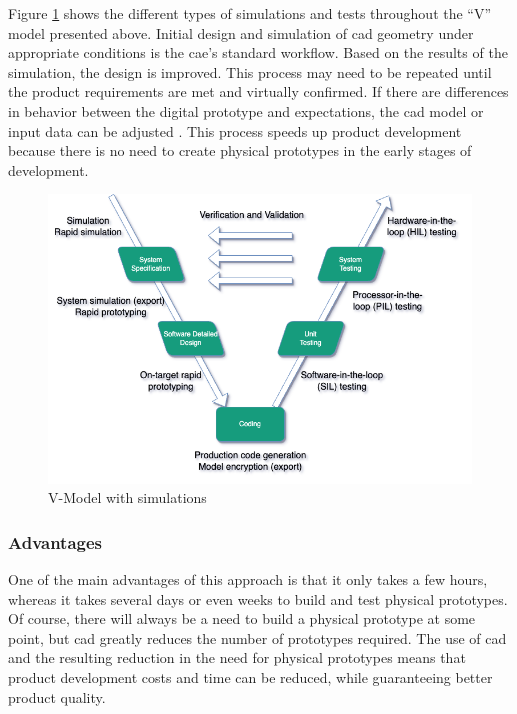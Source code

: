     Figure \ref{fig:v-model-sim} shows the different types of simulations and tests throughout the “V” model presented above. Initial design and simulation of \acrfull{cad} geometry under appropriate conditions is the \acrshort{cae}'s standard workflow. Based on the results of the simulation, the design is improved. This process may need to be repeated until the product requirements are met and virtually confirmed. If there are differences in behavior between the digital prototype and expectations, the \acrshort{cad} model or input data can be adjusted \cite{sellgren1999simulation, jeon2016automatic}. This process speeds up product development because there is no need to create physical prototypes in the early stages of development.

    \begin{figure}[h]
        \centering
        \includegraphics[scale=0.6]{images/Foundation-V-Model-Sim.drawio.png}
        \caption{\label{fig:v-model-sim} V-Model with simulations \cite{validVerifSys} }
    \end{figure}


    \subsubsection{Advantages}
    One of the main advantages of this approach is that it only takes a few hours, whereas it takes several days or even weeks to build and test physical prototypes. Of course, there will always be a need to build a physical prototype at some point, but \acrshort{cad} greatly reduces the number of prototypes required. The use of \acrshort{cad} and the resulting reduction in the need for physical prototypes means that product development costs and time can be reduced, while guaranteeing better product quality.\\


